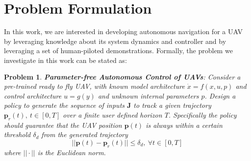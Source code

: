 \documentclass[letterpaper, 10 pt, conference]{ieeeconf}  %
\newcommand\NB[1]{$\spadesuit$\footnote{NB: #1}}
\newtheorem{problem}{Problem}
\begin{document}

\section{Problem Formulation}
In this work, we are interested in developing autonomous navigation for a UAV by leveraging knowledge about its system dynamics and controller and by leveraging a set of human-piloted demonstrations.
Formally, the problem we investigate in this work can be stated as:

\begin{problem}

 \textbf{\textit{Parameter-free Autonomous Control of UAVs}}: 
Consider a pre-trained ready to fly UAV, with known model architecture $\dot{x}=f(x,u,p)$ and control architecture $u=g(y)$ and unknown internal parameters $p$. Design a policy to generate the sequence of inputs $\mathbf{J}$ to track a given trajectory $\mathbf{p}_r(t),~ t \in [0,T]$ over a finite user defined horizon $T$. Specifically the policy should guarantee that the UAV position $\mathbf{p}(t)$ is always within a certain threshold $\delta_d$ from the generated trajectory 
 \begin{equation} \label{eq:positlive}
        ||\mathbf{p}(t)-\mathbf{p}_r(t)|| \leq \delta_d,~\forall t \in [0,T]
    \end{equation}
    where $||\cdot||$ is the Euclidean norm.

\end{problem}
\end{document}
